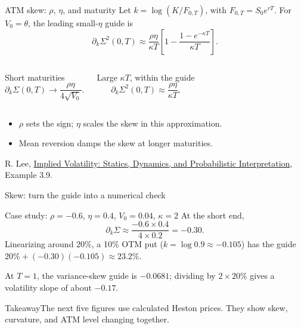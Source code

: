 \documentclass[handout,10pt,t,aspectratio=169]{beamer}
\newenvironment{keybox}{\begin{exampleblock}{Takeaway}}{\end{exampleblock}}
\newcommand{\source}[1]{\vfill{\scriptsize\color{gray}#1\par}}
\begin{document}
\begin{frame}{ATM skew: \(\rho\), \(\eta\), and maturity}
\small
Let \(k=\log(K/F_{0,T})\), with \(F_{0,T}=S_0e^{rT}\).
For \(V_0=\theta\), the leading small-\(\eta\) guide is
\[
\partial_k\Sigma^2(0,T)\approx\frac{\rho\eta}{\kappa T}
\left[1-\frac{1-e^{-\kappa T}}{\kappa T}\right].
\]
\begin{columns}[T,onlytextwidth]
\begin{block}{Short maturities}
\[\partial_k\Sigma(0,T)\longrightarrow\frac{\rho\eta}{4\sqrt{V_0}}.\]
\end{block}
\begin{block}{Large \(\kappa T\), within the guide}
\[\partial_k\Sigma^2(0,T)\approx\frac{\rho\eta}{\kappa T}.\]
\end{block}
\end{columns}
\begin{itemize}
\item \(\rho\) sets the sign; \(\eta\) scales the skew in this approximation.
\item Mean reversion damps the skew at longer maturities.
\end{itemize}
\source{R. Lee, \href{https://math.uchicago.edu/~rogerlee/impvol.pdf}{Implied Volatility: Statics, Dynamics, and Probabilistic Interpretation}, Example 3.9.}
\end{frame}

\begin{frame}{Skew: turn the guide into a numerical check}
\small
\begin{exampleblock}{Case study: \(\rho=-0.6\), \(\eta=0.4\), \(V_0=0.04\), \(\kappa=2\)}
At the short end,
\[
\partial_k\Sigma\approx\frac{-0.6\times0.4}{4\times0.2}=-0.30.
\]
Linearizing around \(20\%\), a 10\% OTM put (\(k=\log0.9\approx-0.105\))
has the guide \(20\%+(-0.30)(-0.105)\approx23.2\%\).
\end{exampleblock}
At \(T=1\), the variance-skew guide is \(-0.0681\); dividing by
\(2\times20\%\) gives a volatility slope of about \(-0.17\).
\begin{keybox}The next five figures use calculated Heston prices.
They show skew, curvature, and ATM level changing together.\end{keybox}
\end{frame}
\end{document}
